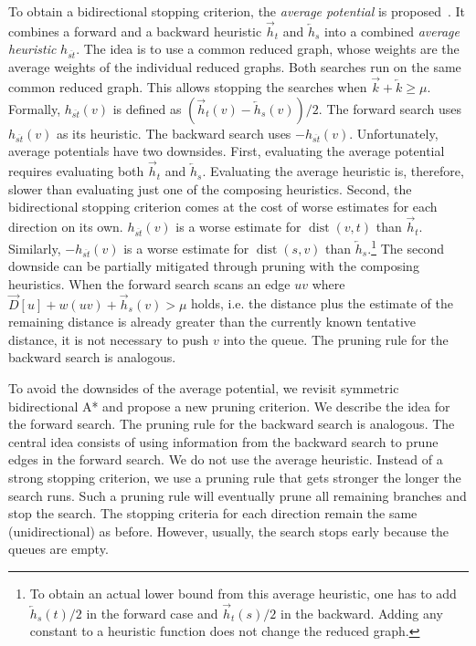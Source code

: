 \documentclass[manuscript]{acmart}
\newcommand*{\dist}{\operatorname{dist}}
\begin{document}
To obtain a bidirectional stopping criterion, the \emph{average potential} is proposed~\cite{gh-cspas-05}.
It combines a forward and a backward heuristic $\overrightarrow{h}_t$ and $\overleftarrow{h}_s$ into a combined \emph{average heuristic} $h_{\overline{st}}$.
The idea is to use a common reduced graph, whose weights are the average weights of the individual reduced graphs.
Both searches run on the same common reduced graph.
This allows stopping the searches when $\overrightarrow{k} + \overleftarrow{k} \geq \mu$.
Formally, $h_{\overline{st}}(v)$ is defined as $(\overrightarrow{h}_t(v) - \overleftarrow{h}_s(v))/2$.
The forward search uses $h_{\overline{st}}(v)$ as its heuristic.
The backward search uses $-h_{\overline{st}}(v)$.
Unfortunately, average potentials have two downsides.
First, evaluating the average potential requires evaluating both $\overrightarrow{h}_t$ and $\overleftarrow{h}_s$.
Evaluating the average heuristic is, therefore, slower than evaluating just one of the composing heuristics.
Second, the bidirectional stopping criterion comes at the cost of worse estimates for each direction on its own.
$h_{\overline{st}}(v)$ is a worse estimate for $\dist(v,t)$ than $\overrightarrow{h}_t$.
Similarly, $-h_{\overline{st}}(v)$ is a worse estimate for $\dist(s,v)$ than $\overleftarrow{h}_s$.\footnote{
To obtain an actual lower bound from this average heuristic, one has to add $\overleftarrow{h}_s(t)/2$ in the forward case and $\overrightarrow{h}_t(s)/2$ in the backward.
Adding any constant to a heuristic function does not change the reduced graph.
}
The second downside can be partially mitigated through pruning with the composing heuristics.
When the forward search scans an edge $uv$ where $\overrightarrow{D}[u] + w(uv) + \overrightarrow{h}_s(v) > \mu$ holds, i.e. the distance plus the estimate of the remaining distance is already greater than the currently known tentative distance, it is not necessary to push $v$ into the queue.
The pruning rule for the backward search is analogous.

To avoid the downsides of the average potential, we revisit symmetric bidirectional A* and propose a new pruning criterion.
We describe the idea for the forward search.
The pruning rule for the backward search is analogous.
The central idea consists of using information from the backward search to prune edges in the forward search.
We do not use the average heuristic.
Instead of a strong stopping criterion, we use a pruning rule that gets stronger the longer the search runs.
Such a pruning rule will eventually prune all remaining branches and stop the search.
The stopping criteria for each direction remain the same (unidirectional) as before.
However, usually, the search stops early because the queues are empty.
\end{document}

